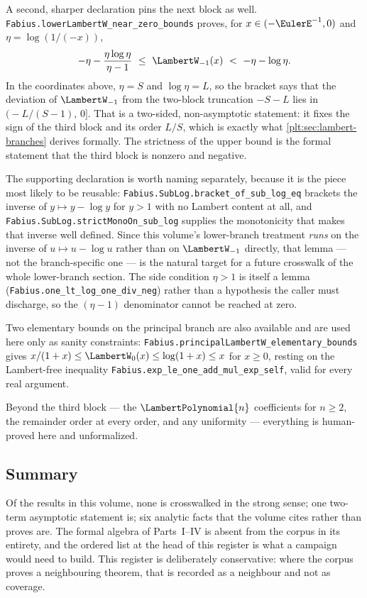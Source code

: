\documentclass[11pt,oneside]{article}
\theoremstyle{plain}
\theoremstyle{definition}
\theoremstyle{remark}
\newcommand{\LamP}[1]{\LambertPolynomial{#1}}
\begin{document}
A second, sharper declaration pins the next block as well.
\texttt{Fabius.lowerLambertW\_near\_zero\_bounds} proves, for
\(x\in(-\EulerE^{-1},0)\) and \(\eta=\log(1/(-x))\),
\[
  -\eta-\frac{\eta\log\eta}{\eta-1}
  \ \le\ \LambertW_{-1}(x)\ <\ -\eta-\log\eta .
\]
In the coordinates above, \(\eta=S\) and \(\log\eta=L\), so the bracket says
that the deviation of \(\LambertW_{-1}\) from the two-block truncation
\(-S-L\) lies in \(\bigl(-L/(S-1),\,0\bigr]\).  That is a two-sided,
non-asymptotic statement: it fixes the sign of the third block and its order
\(L/S\), which is exactly what \cref{plt:sec:lambert-branches} derives
formally.  The strictness of the upper bound is the formal statement that the
third block is nonzero and negative.

The supporting declaration is worth naming separately, because it is the piece
most likely to be reusable:
\texttt{Fabius.SubLog.bracket\_of\_sub\_log\_eq} brackets the inverse of
\(y\mapsto y-\log y\) for \(y>1\) with no Lambert content at all, and
\texttt{Fabius.SubLog.strictMonoOn\_sub\_log} supplies the monotonicity that
makes that inverse well defined.  Since this volume's lower-branch treatment
\emph{runs} on the inverse of \(u\mapsto u-\log u\) rather than on
\(\LambertW_{-1}\) directly, that lemma --- not the branch-specific one --- is
the natural target for a future crosswalk of the whole lower-branch section.
The side condition \(\eta>1\) is itself a lemma
(\texttt{Fabius.one\_lt\_log\_one\_div\_neg}) rather than a hypothesis the
caller must discharge, so the \((\eta-1)\) denominator cannot be reached at
zero.

Two elementary bounds on the principal branch are also available and are used
here only as sanity constraints:
\texttt{Fabius.principalLambertW\_elementary\_bounds} gives
\(x/(1+x)\le\LambertW_{0}(x)\le\log(1+x)\le x\) for \(x\ge0\), resting on the
Lambert-free inequality
\texttt{Fabius.exp\_le\_one\_add\_mul\_exp\_self}, valid for every real
argument.

Beyond the third block --- the \(\LamP{n}\) coefficients for \(n\ge2\), the
remainder order at every order, and any uniformity --- everything is
human-proved here and unformalized.

\subsection{Summary}

Of the results in this volume, none is crosswalked in the strong sense; one
two-term asymptotic statement is; six analytic facts that the volume cites
rather than proves are.  The formal algebra of Parts~I--IV is absent from the
corpus in its entirety, and the ordered list at the head of this register is what a campaign
would need to build.
This register is deliberately conservative: where the corpus proves a
neighbouring theorem, that is recorded as a neighbour and not as coverage.
\end{document}
